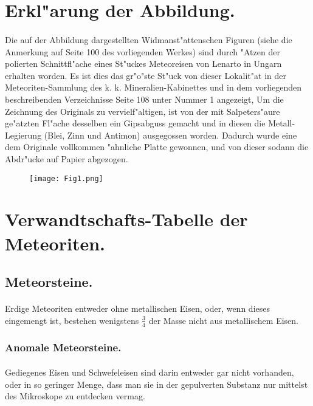 \documentclass[a4paper, 11pt, oneside, polutonikogreek, german]{article}
\begin{document}
\section{Erkl"arung der Abbildung.}
\paragraph{}
Die auf der Abbildung dargestellten Widmanst"attenschen Figuren (siehe die Anmerkung auf Seite 100 des vorliegenden Werkes) sind durch "Atzen der polierten Schnittfl"ache eines St"uckes Meteoreisen von Lenarto in Ungarn erhalten worden. Es ist dies das gr"o"ste St"uck von dieser Lokalit"at in der Meteoriten-Sammlung des k. k. Mineralien-Kabinettes und in dem vorliegenden beschreibenden Verzeichnisse Seite 108 unter Nummer 1 angezeigt, Um die Zeichnung des Originals zu vervielf"altigen, ist von der mit Salpeters"aure ge"atzten Fl"ache desselben ein Gipsabguss gemacht und in diesen die Metall-Legierung (Blei, Zinn und Antimon) ausgegossen worden. Dadurch wurde eine dem Originale vollkommen "ahnliche Platte gewonnen, und von dieser sodann die Abdr"ucke auf Papier abgezogen.
\clearpage
\begin{figure}[b]
\centering
\texttt{[image: Fig1.png]}
\end{figure}
\clearpage
\section{Verwandtschafts-Tabelle der Meteoriten.}
\subsection{Meteorsteine.}
\paragraph{}
Erdige Meteoriten entweder ohne metallischen Eisen, oder, wenn dieses eingemengt ist, bestehen wenigstens $\frac{3}{4}$ der Masse nicht aus metallischem Eisen.
\subsubsection{Anomale Meteorsteine.}
\paragraph{}
Gediegenes Eisen und Schwefeleisen sind darin entweder gar nicht vorhanden, oder in so geringer Menge, dass man sie in der gepulverten Substanz nur mittelst des Mikroskope zu entdecken vermag.
\end{document}
